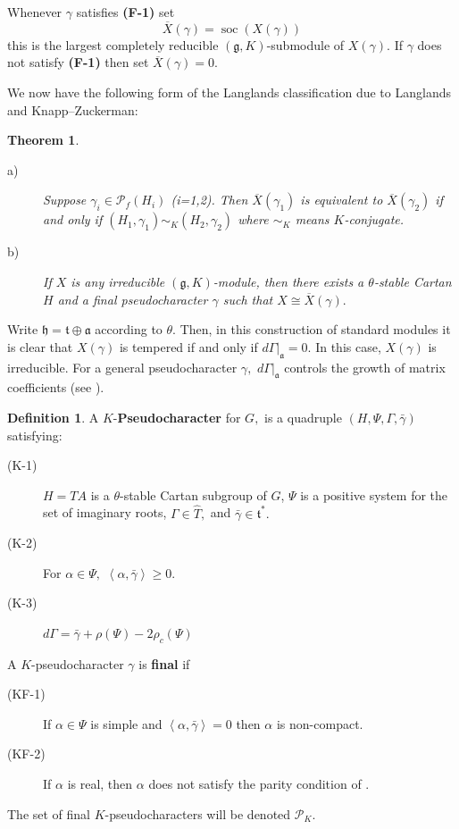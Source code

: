 \documentclass[letterpaper,twosided,11pt]{article}
\theoremstyle{plain}
\newtheorem{theorem}{Theorem}[section]
\theoremstyle{definition}
\newtheorem{definition}{Definition}
\theoremstyle{remark}
\newcommand{\ip}[1]{\left \langle #1 \right \rangle}
\newcommand{\script}[1]{\mathscr{#1}}
\newcommand{\ds}{\oplus}
\newcommand{\lie}[1]{\mathfrak{#1}}
\begin{document}
		Whenever $\gamma$ satisfies \textbf{(F-1)} set \[\overline{X}(\gamma)=\operatorname{soc}(X(\gamma))\]
		this is the largest completely reducible $(\lie{g},K)$-submodule of $X(\gamma).$ If $\gamma$ does not satisfy \textbf{(F-1)} then set $\overline{X}(\gamma)=0.$ 
		
		We now have the following form of the Langlands classification due to Langlands and Knapp--Zuckerman: 
		
			\begin{theorem}\label{Langlands_Classification_Pseudo_Chars}
				\begin{description} 
					\item[a)] Suppose $\gamma_i\in \script{P}_f(H_i)$ (i=1,2). Then $\overline{X}(\gamma_1)$ is equivalent to $\overline{X}(\gamma_2)$ if and only if $(H_1,\gamma_1)\sim_K (H_2,\gamma_2)$ where $\sim_K$ means $K$-conjugate. 
					\item[b)] If $X$ is any irreducible $(\lie{g},K)$-module, then there exists a $\theta$-stable Cartan $H$ and a final pseudocharacter $\gamma$ such that $X\cong \overline{X}(\gamma).$ 
				\end{description} 	
			\end{theorem} 
			
		Write $\lie{h}=\lie{t}\ds \lie{a}$ according to $\theta.$ Then, in this construction of standard modules it is clear that $X(\gamma)$ is tempered if and only if $d\Gamma|_{\lie{a}}=0.$ In this case, $X(\gamma)$ is irreducible. For a general pseudocharacter $\gamma,$ $d\Gamma|_{\lie{a}}$ controls the growth of matrix coefficients (see \cite{CasselmanMilicic1982}). 
		
		\begin{definition} 
			A $K$-\textbf{Pseudocharacter} for $G,$ is a quadruple $(H,\Psi,\Gamma,\bar{\gamma})$ satisfying:
				\begin{description} 
						\item[(K-1)] $H=TA$ is a $\theta$-stable Cartan subgroup of $G$, $\Psi$ is a positive system for the set of imaginary roots, $\Gamma\in \widehat{T},$ and $\bar{\gamma}\in \lie{t}^*.$  
				\item[(K-2)] For $\alpha\in \Psi,$ $\ip{\alpha,\bar{\gamma}}\geq 0.$ 
				\item[(K-3)] $d\Gamma=\bar{\gamma}+\rho(\Psi)-2\rho_c(\Psi)$
				\end{description} 
				A $K$-pseudocharacter $\gamma$ is \textbf{final} if 
			\begin{description} 
				\item[(KF-1)] If $\alpha\in \Psi$ is simple and $\ip{\alpha,\bar{\gamma}}=0$ then $\alpha$ is non-compact. 
				\item[(KF-2)] If $\alpha$ is real, then $\alpha$ does not satisfy the parity condition of \cite[Definition 8.3.11]{Vogan1981}. 
			\end{description} 
				The set of final $K$-pseudocharacters will be denoted $\script{P}_K.$ 
				 
		\end{definition} 	 
		 
\end{document}
